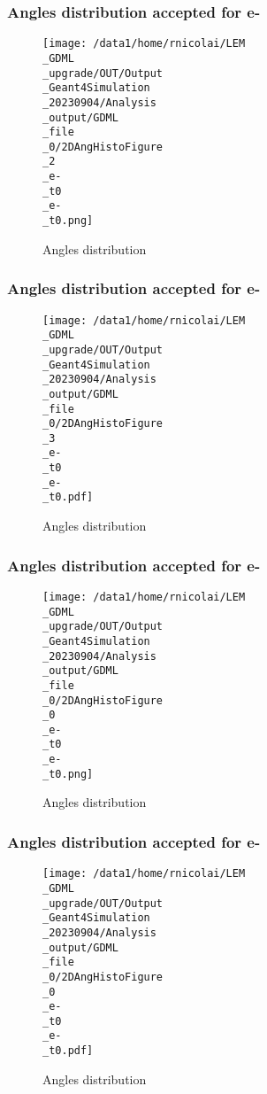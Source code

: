 \documentclass[8pt]{beamer}
\begin{document}
            \begin{frame}
                \frametitle{Angles distribution accepted for e-}
            
        \begin{figure}[h]
            \centering
            \texttt{[image: /data1/home/rnicolai/LEM\\\_GDML\\\_upgrade/OUT/Output\\\_Geant4Simulation\\\_20230904/Analysis\\\_output/GDML\\\_file\\\_0/2DAngHistoFigure\\\_2\\\_e-\\\_t0\\\_e-\\\_t0.png]}
            \caption{Angles distribution}
        \end{figure}
        
            \end{frame}
            
            \begin{frame}
                \frametitle{Angles distribution accepted for e-}
            
        \begin{figure}[h]
            \centering
            \texttt{[image: /data1/home/rnicolai/LEM\\\_GDML\\\_upgrade/OUT/Output\\\_Geant4Simulation\\\_20230904/Analysis\\\_output/GDML\\\_file\\\_0/2DAngHistoFigure\\\_3\\\_e-\\\_t0\\\_e-\\\_t0.pdf]}
            \caption{Angles distribution}
        \end{figure}
        
            \end{frame}
            
            \begin{frame}
                \frametitle{Angles distribution accepted for e-}
            
        \begin{figure}[h]
            \centering
            \texttt{[image: /data1/home/rnicolai/LEM\\\_GDML\\\_upgrade/OUT/Output\\\_Geant4Simulation\\\_20230904/Analysis\\\_output/GDML\\\_file\\\_0/2DAngHistoFigure\\\_0\\\_e-\\\_t0\\\_e-\\\_t0.png]}
            \caption{Angles distribution}
        \end{figure}
        
            \end{frame}
            
            \begin{frame}
                \frametitle{Angles distribution accepted for e-}
            
        \begin{figure}[h]
            \centering
            \texttt{[image: /data1/home/rnicolai/LEM\\\_GDML\\\_upgrade/OUT/Output\\\_Geant4Simulation\\\_20230904/Analysis\\\_output/GDML\\\_file\\\_0/2DAngHistoFigure\\\_0\\\_e-\\\_t0\\\_e-\\\_t0.pdf]}
            \caption{Angles distribution}
        \end{figure}
        
            \end{frame}
            
\end{document}
